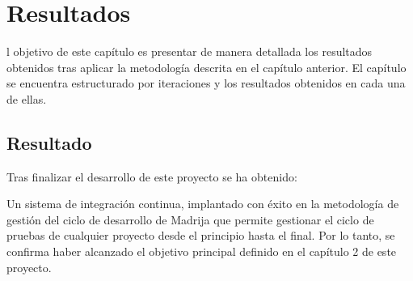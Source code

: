 \chapter{Resultados}

l objetivo de este capítulo es presentar de manera detallada los resultados obtenidos tras aplicar la metodología descrita en el capítulo anterior. El capítulo se encuentra estructurado por iteraciones y los resultados obtenidos en cada una de ellas.

\section{Resultado}

Tras finalizar el desarrollo de este proyecto se ha obtenido:

Un sistema de integración continua, implantado con éxito en la metodología de gestión del ciclo de desarrollo de \ac{Madrija} que permite gestionar el ciclo de pruebas de cualquier proyecto desde el principio hasta el final. Por lo tanto, se confirma haber alcanzado el objetivo principal definido en el capítulo 2 de este proyecto.

